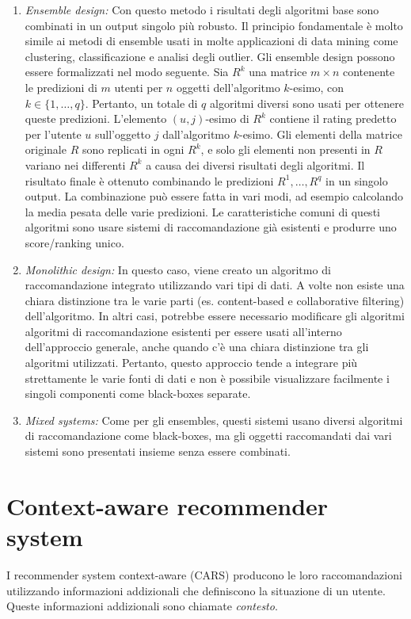 \documentclass[12pt,italian]{report}
\begin{document}
\begin{enumerate}
 \item \textit{Ensemble design:} Con questo metodo i risultati degli algoritmi base sono combinati in un output singolo più robusto. Il principio fondamentale è molto simile ai metodi di ensemble usati in molte applicazioni di data mining come clustering, classificazione e analisi degli outlier. 
Gli ensemble design possono essere formalizzati nel modo seguente. Sia $R^k$ una matrice $m \times n$ contenente le predizioni di $m$ utenti per $n$ oggetti dell'algoritmo $k$-esimo, con $k \in \{1, \dots ,q\}$. Pertanto, un totale di $q$ algoritmi diversi sono usati per ottenere queste predizioni. L'elemento $(u,j)$-esimo di $R^k$ contiene il rating predetto per l'utente $u$ sull'oggetto $j$ dall'algoritmo $k$-esimo. Gli elementi della matrice originale $R$ sono replicati in ogni $R^k$, e solo gli elementi non presenti in $R$ variano nei differenti $R^k$ a causa dei diversi risultati degli algoritmi. Il risultato finale è ottenuto combinando le predizioni $R^1, \dots, R^q$ in un singolo output. La combinazione può essere fatta in vari modi, ad esempio calcolando la media pesata delle varie predizioni. Le caratteristiche comuni di questi algoritmi sono usare sistemi di raccomandazione già esistenti e produrre uno score/ranking unico.
 \item \textit{Monolithic design:} In questo caso, viene creato un algoritmo di raccomandazione integrato utilizzando vari tipi di dati. A volte non esiste una chiara distinzione tra le varie parti (es. content-based e collaborative filtering) dell'algoritmo. In altri casi, potrebbe essere necessario modificare gli algoritmi algoritmi di raccomandazione esistenti per essere usati all'interno dell'approccio generale, anche quando c'è una chiara distinzione tra gli algoritmi utilizzati.  Pertanto, questo approccio tende a integrare più strettamente le varie fonti di dati e non è possibile visualizzare facilmente i singoli componenti come black-boxes separate.
 \item \textit{Mixed systems:}  Come per gli ensembles, questi sistemi usano diversi algoritmi di raccomandazione come black-boxes, ma gli oggetti raccomandati dai vari sistemi sono presentati insieme senza essere combinati.
\end{enumerate} 

\section{Context-aware recommender system}
I recommender system context-aware (CARS) producono le loro raccomandazioni utilizzando informazioni addizionali che definiscono la situazione di un utente. Queste informazioni addizionali sono chiamate \textit{contesto}.
\end{document}
